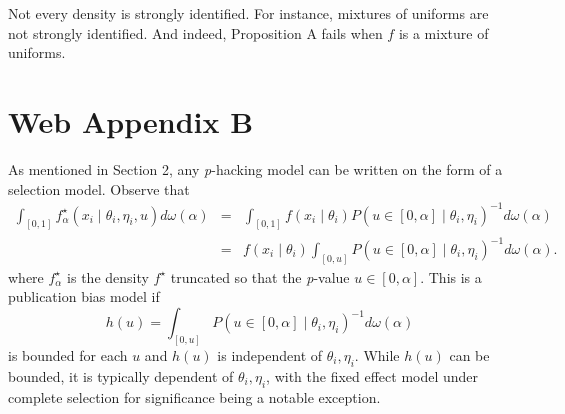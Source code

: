 \documentclass[english]{article}
\begin{document}
Not every density is strongly identified. For instance, mixtures of uniforms are not strongly identified. And indeed, Proposition A fails when $f$ is a mixture of uniforms.






\section*{Web Appendix B}

As mentioned in Section 2, any \textit{p}-hacking model can be written on the form of a selection model. Observe that
\begin{eqnarray*}
\int_{[0,1]}f_\alpha^{\star}(x_{i}\mid\theta_{i},\eta_{i}, u)d\omega(\alpha) & = & \int_{[0,1]}f(x_{i}\mid\theta_{i})P(u\in\left[0,\alpha\right]\mid\theta_{i},\eta_{i})^{-1}d\omega(\alpha)\\
 & = & f(x_{i}\mid\theta_{i})\int_{[0,u]}P(u\in\left[0,\alpha\right]\mid\theta_{i},\eta_{i})^{-1}d\omega(\alpha).
\end{eqnarray*}
where $f_\alpha^{\star}$ is the density $f^{\star}$ truncated so that the \textit{p}-value $u\in\left[0,\alpha\right]$. This is a publication bias model if $$h(u)=\int_{[0,u]}P(u\in\left[0,\alpha\right]\mid\theta_{i},\eta_{i})^{-1}d\omega(\alpha)$$ is bounded for each $u$ and $h(u)$ is independent of $\theta_{i},\eta_{i}$. While $h(u)$ can be bounded, it is typically dependent of $\theta_{i},\eta_{i}$, with the fixed effect model under complete selection for significance being a notable exception.
\end{document}
